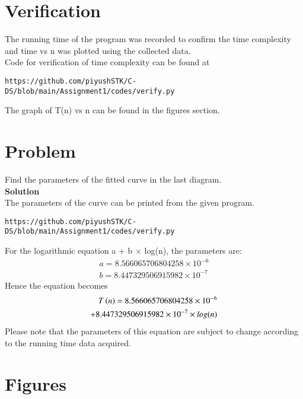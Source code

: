 \documentclass[journal,12pt,twocolumn]{IEEEtran}
\begin{document}
\section{Verification}
The running time of the program was recorded to confirm the time complexity and time vs n was plotted using the collected data.\\
Code for verification of time complexity can be found at 
\begin{lstlisting}
https://github.com/piyushSTK/C-DS/blob/main/Assignment1/codes/verify.py
\end{lstlisting}
The graph of T(n) vs n can be found in the figures section.\\

\section{Problem}
Find the parameters of the fitted curve in the last diagram.\\
\textbf{Solution}\\
The parameters of the curve can be printed from the given program.\\
\begin{lstlisting}
https://github.com/piyushSTK/C-DS/blob/main/Assignment1/codes/verify.py
\end{lstlisting}
For the logarithmic equation a + b $\times$ log(n), the parameters are: 
\begin{equation} \label{eq2}
\begin{split}
a = 8.566065706804258 \times 10^{-6}\\
b = 8.447329506915982\times 10^{-7}
\end{split}
\end{equation}
Hence the equation becomes 
\begin{equation} \label{eq2}
\begin{split}
T\left(n\right) = 8.566065706804258 \times 10^{-6} \\+ 8.447329506915982\times 10^{-7}\times log(n)
\end{split}
\end{equation}
Please note that the parameters of this equation are subject to change according to the running time data acquired.








\setcounter{figure}{0}

\section{Figures}
\label{Figures}
\end{document}

